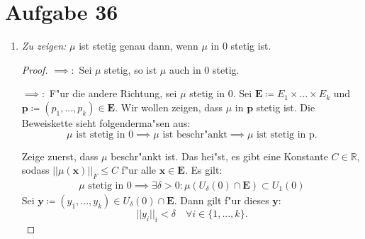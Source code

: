 \documentclass[a4paper, landscape,twocolumn,fontsize=8pt]{scrartcl}
\theoremstyle{plain}
\begin{document}
\section*{Aufgabe 36}
\begin{enumerate}[label=(\roman*)]
	\item \textit{Zu zeigen:} $\mu$ ist stetig genau dann, wenn $\mu$ in $0$ stetig 	ist. 
	\begin{proof}
		$\implies:$ Sei $\mu$ stetig, so ist $\mu$ auch in $0$ stetig.
		
		$\implies:$ F"ur die andere Richtung, sei $\mu$ stetig in $0$. Sei $\mathbf E \coloneqq  E_1 \times ... \times E_k$ und $\mathbf p \coloneqq (p_1,...,p_k) \in \mathbf E$. Wir wollen zeigen, dass $\mu$ in $\mathbf p$ stetig ist. Die Beweiskette sieht folgenderma"sen aus:
		\[
			\mu \text{ ist stetig in } 0 \implies \mu \text{ ist beschr"ankt} \implies \mu \text{ ist stetig in p}.
		\]
	
	Zeige zuerst, dass $\mu$ beschr"ankt ist. Das hei"st, es gibt eine Konstante $C \in \mathbb R$, sodass $||\mu(\mathbf x)||_F \leq C$ f"ur alle $\mathbf x \in \mathbf E$. Es gilt:
	\begin{align*}
		\mu \text{ stetig in } 0 \implies \exists \delta > 0: \mu(U_\delta(0) \cap \mathbf E) \subset U_1(0)
	\end{align*}
	Sei $\mathbf y \coloneqq (y_1,...,y_k) \in U_\delta(0) \cap \mathbf E$. Dann gilt f"ur dieses $\mathbf y$:
	\[
		||y_i||_i < \delta  \quad \forall i \in \{1,...,k\}.
	\]
	\end{proof}
\end{enumerate}
\end{document}
